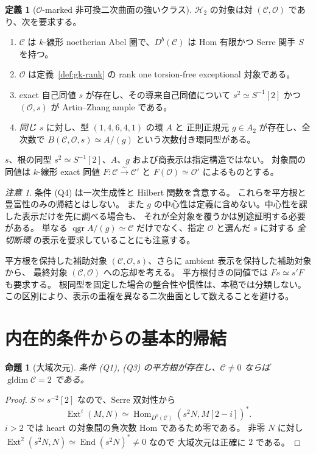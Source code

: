 \documentclass[a4paper,11pt]{ltjsarticle}
\numberwithin{equation}{section}
\theoremstyle{plain}
\newtheorem{proposition}[theorem]{命題}
\theoremstyle{definition}
\newtheorem{definition}[theorem]{定義}
\theoremstyle{remark}
\newtheorem{remark}[theorem]{注意}
\newcommand{\OO}{\mathcal O}
\newcommand{\cC}{\mathcal C}
\newcommand{\HH}{\mathcal H_2}
\DeclareMathOperator{\Hom}{Hom}
\DeclareMathOperator{\End}{End}
\DeclareMathOperator{\Ext}{Ext}
\DeclareMathOperator{\qgr}{qgr}
\DeclareMathOperator{\gldim}{gldim}
\begin{document}
\begin{definition}[$\OO$-marked 非可換二次曲面の強いクラス]
\label{def:h2}
$\HH$ の対象は対 $(\cC,\OO)$ であり、次を要求する。
\begin{enumerate}[label=(Q\arabic*)]
\item $\cC$ は $k$-線形 noetherian Abel 圏で、$D^b(\cC)$ は Hom 有限かつ
      Serre 関手 $S$ を持つ。
\item $\OO$ は定義~\ref{def:gk-rank} の rank one torsion-free exceptional 対象である。
\item exact 自己同値 $s$ が存在し、その導来自己同値について
      $s^2\simeq S^{-1}[2]$ かつ $(\OO,s)$ が Artin--Zhang ample である。
\item \emph{同じ $s$} に対し、型 $(1,4,6,4,1)$ の環 $A$ と
      正則正規元 $g\in A_2$ が存在し、全次数で
      $B(\cC,\OO,s)\simeq A/(g)$ という次数付き環同型がある。
\end{enumerate}
$s$、根の同型 $s^2\simeq S^{-1}[2]$、$A$、$g$ および商表示は指定構造ではない。
対象間の同値は $k$-線形 exact 同値 $F:\cC\xrightarrow{\sim}\cC'$ と
$F(\OO)\simeq\OO'$ によるものとする。
\end{definition}

\begin{remark}
条件 (Q4) は一次生成性と Hilbert 関数を含意する。
これらを平方根と豊富性のみの帰結とはしない。
また $g$ の中心性は定義に含めない。中心性を課した表示だけを先に調べる場合も、
それが全対象を覆うかは別途証明する必要がある。
単なる $\qgr A/(g)\simeq\cC$ だけでなく、指定 $\OO$ と選んだ $s$ に対する
\emph{全切断環} の表示を要求していることにも注意する。
\end{remark}

平方根を保持した補助対象 $(\cC,\OO,s)$、さらに ambient 表示を保持した補助対象から、
最終対象 $(\cC,\OO)$ への忘却を考える。
平方根付きの同値では $Fs\simeq s'F$ も要求する。
根同型を固定した場合の整合性や慣性は、本稿では分類しない。
この区別により、表示の重複を異なる二次曲面として数えることを避ける。



\section{内在的条件からの基本的帰結}
\label{sec:categorical-consequences}

\begin{proposition}[大域次元]
\label{prop:gldim-two}
条件 (Q1), (Q3) の平方根が存在し、$\cC\ne0$ ならば $\gldim\cC=2$ である。
\end{proposition}
\begin{proof}
$S\simeq s^{-2}[2]$ なので、Serre 双対性から
\[
 \Ext^i(M,N)\simeq\Hom_{D^b(\cC)}(s^2N,M[2-i])^* .
\]
$i>2$ では heart の対象間の負次数 Hom であるため零である。
非零 $N$ に対し $\Ext^2(s^2N,N)\simeq\End(s^2N)^*\ne0$ なので
大域次元は正確に $2$ である。
\end{proof}
\end{document}
